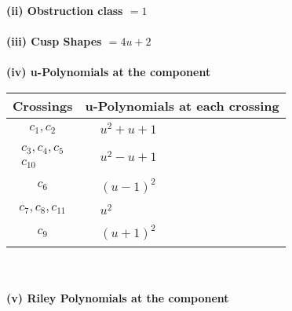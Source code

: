 \documentclass[1p]{elsarticle_modified}
\theoremstyle{definition}
\begin{document}
\flushleft \textbf{(ii) Obstruction class $= 1$}\\~\\
\flushleft \textbf{(iii) Cusp Shapes $= 4 u+2$}\\~\\
\newpage\renewcommand{\arraystretch}{1}
\flushleft \textbf{(iv) u-Polynomials at the component}\newline \\
\begin{tabular}{m{50pt}|m{274pt}}
Crossings & \hspace{64pt}u-Polynomials at each crossing \\
\hline $$\begin{aligned}c_{1},c_{2}\end{aligned}$$&$\begin{aligned}
&u^2+u+1
\end{aligned}$\\
\hline $$\begin{aligned}c_{3},c_{4},c_{5}\\c_{10}\end{aligned}$$&$\begin{aligned}
&u^2- u+1
\end{aligned}$\\
\hline $$\begin{aligned}c_{6}\end{aligned}$$&$\begin{aligned}
&(u-1)^2
\end{aligned}$\\
\hline $$\begin{aligned}c_{7},c_{8},c_{11}\end{aligned}$$&$\begin{aligned}
&u^2
\end{aligned}$\\
\hline $$\begin{aligned}c_{9}\end{aligned}$$&$\begin{aligned}
&(u+1)^2
\end{aligned}$\\
\hline
\end{tabular}\\~\\
\newpage\renewcommand{\arraystretch}{1}
\flushleft \textbf{(v) Riley Polynomials at the component}\newline \\
\end{document}
